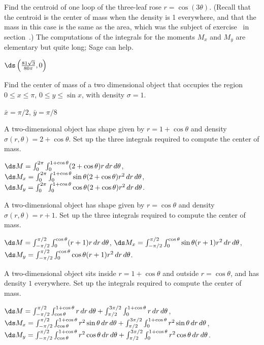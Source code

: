 \begin{exercises}
\exercise Find the centroid of one loop of the three-leaf rose
$r=\cos(3\theta)$.  (Recall that the centroid is the
center of mass when the density is 1 everywhere, and that the mass in
this case is the same as the area, which was the subject of
exercise~ in
section~.)  The
computations of the integrals for the moments $M_x$ and $M_y$ are
elementary but quite long; Sage can help.
\begin{answer} $\ds\left({81\sqrt3\over80\pi},0\right)$
\end{answer}


\exercise Find the center of mass of a two dimensional
object that occupies the region $0\le x\le \pi$, $0\le y\le \sin x$,
with density $\sigma=1$.
\begin{answer} $\bar x=\pi/2$, $\bar y=\pi/8$ 
\end{answer}

\exercise A two-dimensional object has shape given by 
$r=1+\cos\theta$ and density $\sigma(r,\theta)=2+\cos\theta$. Set up
the three integrals required to compute the center of mass.
\begin{answer} $\ds M=\int_0^{2\pi} \int_0^{1+\cos\theta} (2+\cos\theta)r\,dr\,d\theta$,
\hfill\break
$\ds M_x=\int_0^{2\pi} \int_0^{1+\cos\theta} \sin\theta(2+\cos\theta)r^2\,dr\,d\theta$,
\hfill\break
$\ds M_y=\int_0^{2\pi} \int_0^{1+\cos\theta} \cos\theta(2+\cos\theta)r^2\,dr\,d\theta$.
\end{answer}

\exercise A two-dimensional object has shape given by 
$r=\cos\theta$ and density $\sigma(r,\theta)=r+1$. Set up
the three integrals required to compute the center of mass.
\begin{answer} $\ds M=\int_{-\pi/2}^{\pi/2} \int_0^{\cos\theta} (r+1)r\,dr\,d\theta$,
\hfill\break
$\ds M_x=\int_{-\pi/2}^{\pi/2} \int_0^{\cos\theta} \sin\theta(r+1)r^2\,dr\,d\theta$,
\hfill\break
$\ds M_y=\int_{-\pi/2}^{\pi/2} \int_0^{\cos\theta} \cos\theta(r+1)r^2\,dr\,d\theta$.
\end{answer}

\exercise A two-dimensional object sits inside $r=1+\cos\theta$
and outside $r=\cos\theta$, and has density $1$ everywhere.
Set up
the integrals required to compute the center of mass.
\begin{answer} $\ds M= \int_{-\pi/2}^{\pi/2}\int_{\cos\theta}^{1+\cos\theta}
r\,dr\,d\theta + \int_{\pi/2}^{3\pi/2}\int_0^{1+\cos\theta}r\,dr\,d\theta$,
\hfill\break
$\ds M_x=\int_{-\pi/2}^{\pi/2}\int_{\cos\theta}^{1+\cos\theta}
r^2\sin\theta\,dr\,d\theta + \int_{\pi/2}^{3\pi/2}\int_0^{1+\cos\theta}r^2\sin\theta\,dr\,d\theta$,
\hfill\break
$\ds M_y=\int_{-\pi/2}^{\pi/2}\int_{\cos\theta}^{1+\cos\theta}
r^2\cos\theta\,dr\,d\theta + \int_{\pi/2}^{3\pi/2}\int_0^{1+\cos\theta}r^2\cos\theta\,dr\,d\theta$.
\end{answer}

\end{exercises}
